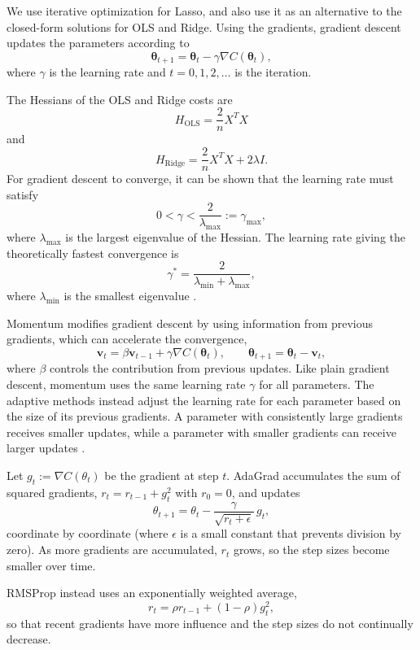 \documentclass[amssymb,twocolumn,aps]{revtex4}
\begin{document}
We use iterative optimization for Lasso, and also use it as an alternative to the closed-form solutions for OLS and Ridge. Using the gradients, gradient descent updates the parameters according to
\begin{equation}
    \boldsymbol{\theta}_{t+1}
    =
    \boldsymbol{\theta}_t
    -
    \gamma\nabla C(\boldsymbol{\theta}_t),
    \label{eq:gradient_descent}
\end{equation}
where $\gamma$ is the learning rate and $t=0,1,2,\ldots$ is the iteration.

The Hessians of the OLS and Ridge costs are
\[
    H_{\mathrm{OLS}}
    =
    \frac{2}{n}X^TX
\]
and
\[
    H_{\mathrm{Ridge}}
    =
    \frac{2}{n}X^TX+2\lambda I.
\]
For gradient descent to converge, it can be shown that the learning rate must satisfy
\[
    0<\gamma<\frac{2}{\lambda_{\max}}
    :=\gamma_{\max},
\]
where $\lambda_{\max}$ is the largest eigenvalue of the Hessian. The learning rate giving the theoretically fastest convergence is
\[
    \gamma^*
    =
    \frac{2}{\lambda_{\min}+\lambda_{\max}},
\]
where $\lambda_{\min}$ is the smallest eigenvalue \cite{lecturebook}.

Momentum modifies gradient descent by using information from previous gradients, which can accelerate the convergence,
\[
    \boldsymbol{v}_t = \beta\boldsymbol{v}_{t-1} + \gamma\nabla C(\boldsymbol{\theta}_t),
    \qquad
    \boldsymbol{\theta}_{t+1} = \boldsymbol{\theta}_t - \boldsymbol{v}_t,
\]
where $\beta$ controls the contribution from previous updates.
Like plain gradient descent, momentum uses the same learning rate $\gamma$ for all parameters. The adaptive methods instead adjust the learning rate for each parameter based on the size of its previous gradients. A parameter with consistently large gradients receives smaller updates, while a parameter with smaller gradients can receive larger updates \cite{lecturebook}.

Let $g_t:=\nabla C(\theta_t)$ be the gradient at step $t$. AdaGrad accumulates the sum of squared gradients, $r_t=r_{t-1}+g_t^2$ with $r_0=0$, and updates
\[
    \theta_{t+1} = \theta_t - \frac{\gamma}{\sqrt{r_t+\epsilon}}\,g_t,
\]
coordinate by coordinate (where $\epsilon$ is a small constant that prevents division by zero). As more gradients are accumulated, $r_t$ grows, so the step sizes become smaller over time.

RMSProp instead uses an exponentially weighted average,
\[
    r_t=\rho r_{t-1}+(1-\rho)g_t^2,
\]
so that recent gradients have more influence and the step sizes do not continually decrease.
\end{document}
